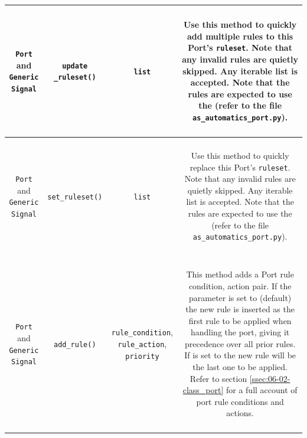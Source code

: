 \begin{longtable}[htbp]{|c|c|c|c|}
\parbox{2.5cm}{~\\ \texttt{Port}\\ and\\ \texttt{Generic Signal}\\~} & \parbox{3cm}{~\\ \texttt{update \_ruleset()}\\~} & \parbox{3cm}{~ \\ \texttt{list} \\ ~} & \parbox{6cm}{~\\ Use this method to quickly add multiple rules to this Port's \texttt{ruleset}. Note that any invalid rules are quietly skipped. Any iterable list is accepted. Note that the rules are expected to use the  (refer to the file \texttt{as\_automatics\_port.py}). \\~}\\
\hline
\parbox{2.5cm}{~\\ \texttt{Port} \\ and\\ \texttt{Generic Signal}\\~} & \parbox{3cm}{~\\ \texttt{set\_ruleset()}\\~} & \parbox{3cm}{~ \\ \texttt{list} \\ ~} & \parbox{6cm}{~\\ Use this method to quickly replace this Port's \texttt{ruleset}. Note that any invalid rules are quietly skipped. Any iterable list is accepted. Note that the rules are expected to use the  (refer to the file \texttt{as\_automatics\_port.py}). \\~}\\
\hline

\parbox{2.5cm}{~\\ \texttt{Port} \\ and\\ \texttt{Generic Signal}\\~} & \parbox{3cm}{~\\ \texttt{add\_rule()}\\~} & \parbox{3cm}{~ \\ \texttt{rule\_condition}, \texttt{rule\_action}, \texttt{priority} \\ ~} & \parbox{6cm}{~\\ This method adds a Port rule condition, action pair. If the parameter  is set to  (default) the new rule is inserted as the first rule to be applied when handling the port, giving it precedence over all prior rules. If  is set to   the new rule will be the last one to be applied. Refer to section \ref{ssec:06-02-class_port} for a full account of port rule conditions and actions. \\~}\\
\hline


\end{longtable}
